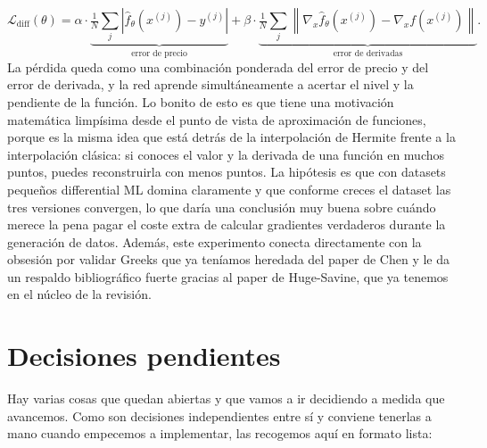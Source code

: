 \documentclass[11pt,a4paper]{article}
\begin{document}
\begin{equation}
\mathcal{L}_{\mathrm{diff}}(\theta) = \alpha \cdot \underbrace{\tfrac{1}{N} \textstyle\sum_j \left| \hat{f}_\theta(x^{(j)}) - y^{(j)} \right|}_{\text{error de precio}} + \beta \cdot \underbrace{\tfrac{1}{N} \textstyle\sum_j \left\| \nabla_x \hat{f}_\theta(x^{(j)}) - \nabla_x f(x^{(j)}) \right\|}_{\text{error de derivadas}}.
\end{equation}
La pérdida queda como una combinación ponderada del error de precio y del error de derivada, y la red aprende simultáneamente a acertar el nivel y la pendiente de la función. Lo bonito de esto es que tiene una motivación matemática limpísima desde el punto de vista de aproximación de funciones, porque es la misma idea que está detrás de la interpolación de Hermite frente a la interpolación clásica: si conoces el valor y la derivada de una función en muchos puntos, puedes reconstruirla con menos puntos. La hipótesis es que con datasets pequeños differential ML domina claramente y que conforme creces el dataset las tres versiones convergen, lo que daría una conclusión muy buena sobre cuándo merece la pena pagar el coste extra de calcular gradientes verdaderos durante la generación de datos. Además, este experimento conecta directamente con la obsesión por validar Greeks que ya teníamos heredada del paper de Chen y le da un respaldo bibliográfico fuerte gracias al paper de Huge-Savine, que ya tenemos en el núcleo de la revisión.

\section{Decisiones pendientes}

Hay varias cosas que quedan abiertas y que vamos a ir decidiendo a medida que avancemos. Como son decisiones independientes entre sí y conviene tenerlas a mano cuando empecemos a implementar, las recogemos aquí en formato lista:
\end{document}
